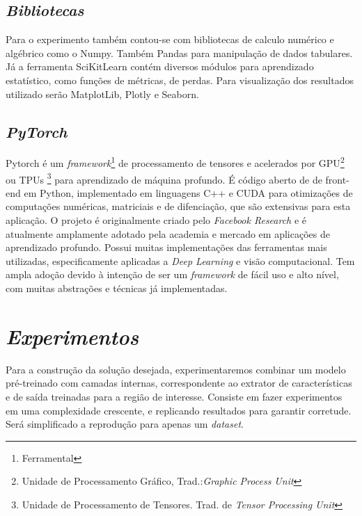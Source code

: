 \subsection{\textit{Bibliotecas}}\label{sec:Cap2_NumpyPandas}

Para o experimento também contou-se com bibliotecas de calculo numérico e algébrico como o Numpy. Também Pandas para manipulação de dados tabulares. Já a ferramenta SciKitLearn contém diversos módulos para aprendizado estatístico, como funções de métricas, de perdas. Para visualização dos resultados utilizado serão MatplotLib, Plotly e Seaborn.

\subsection{\textit{PyTorch}}\label{sec:Cap2_PyTorch}
Pytorch é um \textit{framework}\footnote{Ferramental} de processamento de tensores e acelerados por GPU\footnote[3]{Unidade de Processamento Gráfico, Trad.:\textit{Graphic Process Unit}} ou TPUs \footnote{Unidade de Processamento de Tensores. Trad. de \textit{Tensor Processing Unit}} para aprendizado de máquina profundo. É código aberto de de front-end em Python, implementado em linguagens C++ e CUDA para otimizações de computações numéricas, matriciais e de difenciação, que são extensivas para esta aplicação.
O projeto é originalmente criado pelo \textit{Facebook Research} e é atualmente amplamente adotado pela academia e mercado em aplicações de aprendizado profundo. Possui muitas implementações das ferramentas mais utilizadas, especificamente aplicadas a \textit{Deep Learning} e visão computacional. Tem ampla adoção devido à intenção de ser um \textit{framework} de fácil uso e alto nível, com muitas abstrações e técnicas já implementadas.



\section{\textit{Experimentos}}\label{sec:Cap3_Experimentos}

Para a construção da solução desejada, experimentaremos combinar um modelo pré-treinado com camadas internas, correspondente ao extrator de características e de saída treinadas para a região de interesse.
Consiste em fazer experimentos em uma complexidade crescente, e replicando resultados para garantir corretude. Será simplificado a reprodução para apenas um \textit{dataset}.


